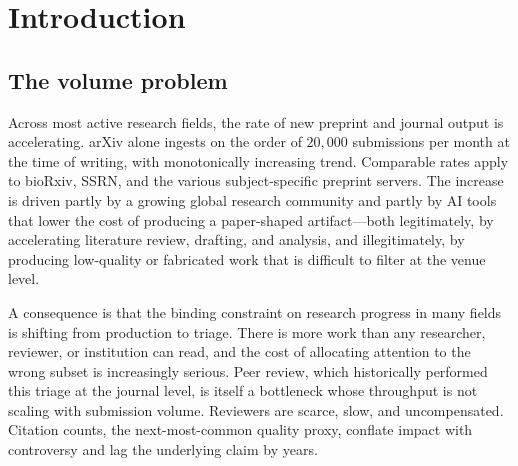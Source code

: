 \documentclass[11pt]{rrxiv}
\begin{document}
\begin{abstract}
extend through annotations on the live corpus. v3 had a smaller claim set (4 claims) and was the first revision to dogfood the open ORCID submission flow on \texttt{rrxiv.com}; v2 introduced the survey of RRPs 0012--0020 that landed between v0.1 and the present (server-derived replication status, semantic revision diffs, annotation threading, author claim retraction). The v2 survey carries forward unchanged in this revision.

\medskip
\noindent\textit{Keywords:} preprint servers, open science, claim graphs, AI agents, scientific infrastructure, protocol design.
\end{abstract}

\section{Introduction}
\label{sec:intro}

\subsection{The volume problem}

Across most active research fields, the rate of new preprint and journal output is accelerating. arXiv alone ingests on the order of $20{,}000$ submissions per month at the time of writing, with monotonically increasing trend. Comparable rates apply to bioRxiv, SSRN, and the various subject-specific preprint servers. The increase is driven partly by a growing global research community and partly by AI tools that lower the cost of producing a paper-shaped artifact---both legitimately, by accelerating literature review, drafting, and analysis, and illegitimately, by producing low-quality or fabricated work that is difficult to filter at the venue level.

A consequence is that the binding constraint on research progress in many fields is shifting from production to triage. There is more work than any researcher, reviewer, or institution can read, and the cost of allocating attention to the wrong subset is increasingly serious. Peer review, which historically performed this triage at the journal level, is itself a bottleneck whose throughput is not scaling with submission volume. Reviewers are scarce, slow, and uncompensated. Citation counts, the next-most-common quality proxy, conflate impact with controversy and lag the underlying claim by years.
\end{document}
